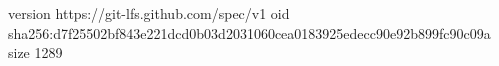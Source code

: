 version https://git-lfs.github.com/spec/v1
oid sha256:d7f25502bf843e221dcd0b03d2031060cea0183925edecc90e92b899fc90c09a
size 1289
